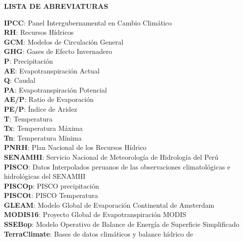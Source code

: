 \documentclass[12pt]{article}
\begin{document}
	

\clearpage

\tableofcontents
\clearpage
\listoffigures
\clearpage
\listoftables
\clearpage
\listofappendices
\clearpage

\begin{center}
\large{\textbf {LISTA DE ABREVIATURAS}}
\end{center}

\textbf{IPCC}: Panel Intergubernamental en Cambio Climático \\
\textbf{RH}: Recursos Hídricos \\
\textbf{GCM}: Modelos de Circulación General \\
\textbf{GHG}: Gases de Efecto Invernadero \\
\textbf{P}: Precipitación \\
\textbf{AE}: Evapotranspiración Actual \\
\textbf{Q}: Caudal \\
\textbf{PA}: Evapotranspiración Potencial \\
\textbf{AE/P}: Ratio de Evaporación \\
\textbf{PE/P}: Índice de Aridez \\
\textbf{T}: Temperatura \\
\textbf{Tx}: Temperatura Máxima \\
\textbf{Tn}: Temperatura Mínima \\
\textbf{PNRH}: Plan Nacional de los Recursos Hídrico \\
\textbf{SENAMHI}: Servicio Nacional de Meteorología de Hidrología del Perú \\
\textbf{PISCO}: Datos Interpolados peruanos de las observaciones climatológicas e hidrológicas del SENAMHI \\
\textbf{PISCOp}: PISCO precipitación \\
\textbf{PISCOt}: PISCO Temperatura \\
\textbf{GLEAM}: Modelo Global de Evaporación Continental de Amsterdam \citep{Martens2017} \\
\textbf{MODIS16}: Proyecto Global de Evapotranspiración MODIS \citep{mu2013modis} \\
\textbf{SSEBop}: Modelo Operativo de Balance de Energía de Superficie Simplificado \\
\textbf{TerraClimate}: Bases de datos climáticos y balance hídrico de \citet{abatzoglou2018terraclimate}\\
\end{document}
